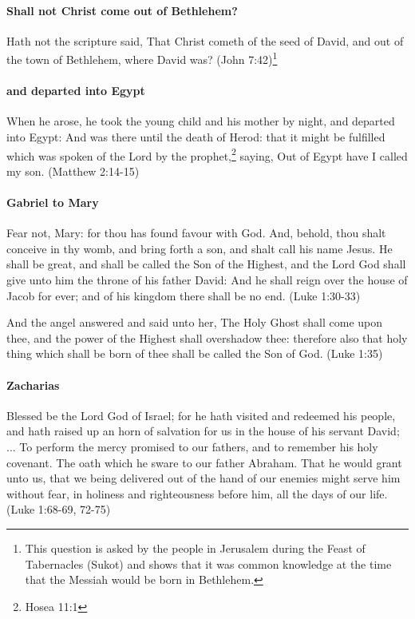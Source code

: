 \paragraph{Shall not Christ come out of Bethlehem?}
Hath not the scripture said, That Christ cometh of the seed of David, and out of the town of Bethlehem, where David was? (John 7:42)\footnote{This question is asked by the people in Jerusalem during the Feast of Tabernacles (Sukot) and shows that it was common knowledge at the time that the Messiah would be born in Bethlehem.}

\paragraph{and departed into Egypt}
When he arose, he took the young child and his mother by night, and departed into Egypt: And was there until the death of Herod: that it might be fulfilled which was spoken of the Lord by the prophet,\footnote{Hosea 11:1} saying, Out of Egypt have I called my son. (Matthew 2:14-15)

\paragraph{Gabriel to Mary}
Fear not, Mary: for thou has found favour with God. And, behold, thou shalt conceive in thy womb, and bring forth a son, and shalt call his name Jesus. He shall be great, and shall be called the Son of the Highest, and the Lord God shall give unto him the throne of his father David: And he shall reign over the house of Jacob for ever; and of his kingdom there shall be no end. (Luke 1:30-33)

And the angel answered and said unto her, The Holy Ghost shall come upon thee, and the power of the Highest shall overshadow thee: therefore also that holy thing which shall be born of thee shall be called the Son of God. (Luke 1:35)

\paragraph{Zacharias}
Blessed be the Lord God of Israel; for he hath visited and redeemed his people, and hath raised up an horn of salvation for us in the house of his servant David; ... To perform the mercy promised to our fathers, and to remember his holy covenant. The oath which he sware to our father Abraham. That he would grant unto us, that we being delivered out of the hand of our enemies might serve him without fear, in holiness and righteousness before him, all the days of our life. (Luke 1:68-69, 72-75)

